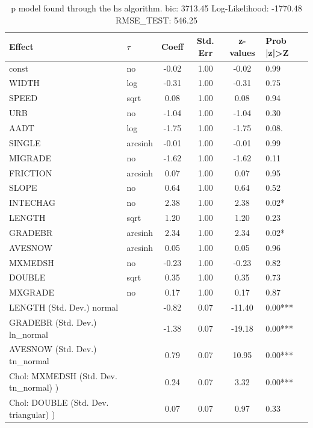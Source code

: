 \begin{table}
	\caption{p model found through the hs algorithm. bic: 3713.45 Log-Likelihood: -1770.48 RMSE_TEST: 546.25}
	\begin{center}
		\begin{tabular}{|l|l|c|c|c|l|}
			\hline
			Effect & $\tau$ & Coeff & Std. Err & z-values & Prob |z|>Z \\
			\hline
			const & no & -0.02 & 1.00 & -0.02 & 0.99 \\
			\hline
			WIDTH & log & -0.31 & 1.00 & -0.31 & 0.75 \\
			\hline
			SPEED & sqrt & 0.08 & 1.00 & 0.08 & 0.94 \\
			\hline
			URB & no & -1.04 & 1.00 & -1.04 & 0.30 \\
			\hline
			AADT & log & -1.75 & 1.00 & -1.75 & 0.08. \\
			\hline
			SINGLE & arcsinh & -0.01 & 1.00 & -0.01 & 0.99 \\
			\hline
			MIGRADE & no & -1.62 & 1.00 & -1.62 & 0.11 \\
			\hline
			FRICTION & arcsinh & 0.07 & 1.00 & 0.07 & 0.95 \\
			\hline
			SLOPE & no & 0.64 & 1.00 & 0.64 & 0.52 \\
			\hline
			INTECHAG & no & 2.38 & 1.00 & 2.38 & 0.02* \\
			\hline
			LENGTH & sqrt & 1.20 & 1.00 & 1.20 & 0.23 \\
			\hline
			GRADEBR & arcsinh & 2.34 & 1.00 & 2.34 & 0.02* \\
			\hline
			AVESNOW & arcsinh & 0.05 & 1.00 & 0.05 & 0.96 \\
			\hline
			MXMEDSH & no & -0.23 & 1.00 & -0.23 & 0.82 \\
			\hline
			DOUBLE & sqrt & 0.35 & 1.00 & 0.35 & 0.73 \\
			\hline
			MXGRADE & no & 0.17 & 1.00 & 0.17 & 0.87 \\
			\hline
			LENGTH (Std. Dev.) normal &  & -0.82 & 0.07 & -11.40 & 0.00*** \\
			\hline
			GRADEBR (Std. Dev.) ln_normal &  & -1.38 & 0.07 & -19.18 & 0.00*** \\
			\hline
			AVESNOW (Std. Dev.) tn_normal &  & 0.79 & 0.07 & 10.95 & 0.00*** \\
			\hline
			 Chol: MXMEDSH (Std. Dev. tn_normal) ) &  & 0.24 & 0.07 & 3.32 & 0.00*** \\
			\hline
			 Chol: DOUBLE (Std. Dev. triangular) ) &  & 0.07 & 0.07 & 0.97 & 0.33 \\

\end{tabular}
\end{center}
\end{table}
